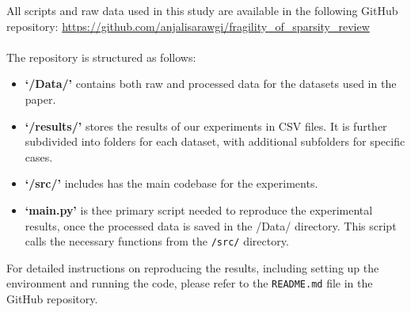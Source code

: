 All scripts and raw data used in this study are available in the following GitHub repository: \href{https://github.com/anjalisarawgi/fragility_of_sparsity_review}{https://github.com/anjalisarawgi/fragility\_of\_sparsity\_review}\\
\\
The repository is structured as follows:
\begin{itemize}
    \item \textbf{`/Data/'} contains both raw and processed data for the datasets used in the paper. 
    \item \textbf{`/results/'} stores the results of our experiments in CSV files. It is further subdivided into folders for each dataset, with additional subfolders for specific cases.
    \item \textbf{`/src/'} includes has the main codebase for the experiments. 
    \item \textbf{`main.py'} is thee primary script needed to reproduce the experimental results, once the processed data is saved in the /Data/ directory. This script calls the necessary functions from the \texttt{/src/} directory.
\end{itemize}
For detailed instructions on reproducing the results, including setting up the environment and running the code, please refer to the \texttt{README.md} file in the GitHub repository.
\newpage
    

\RaggedRight


\newpage




